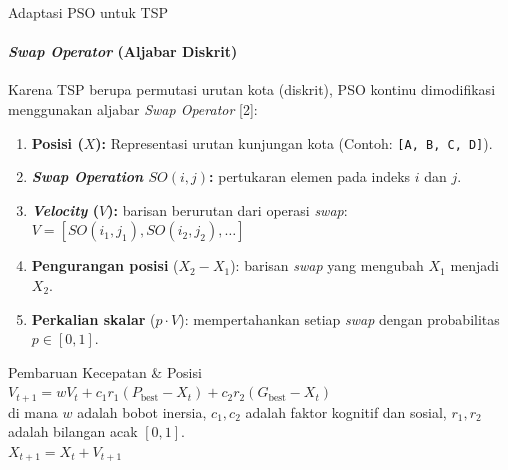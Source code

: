 \documentclass[aspectratio=169,10pt]{beamer}
\begin{document}
\begin{frame}{Adaptasi PSO untuk TSP}
  \framesubtitle{\textit{Swap Operator} (Aljabar Diskrit)}
  Karena TSP berupa permutasi urutan kota (diskrit), PSO kontinu dimodifikasi menggunakan aljabar \textit{Swap Operator} [2]:
  
  \vspace{0.1cm}
  \begin{enumerate}\small
    \item \textbf{Posisi ($X$):} Representasi urutan kunjungan kota (Contoh: \texttt{[A, B, C, D]}).
    \item \textbf{\textit{Swap Operation} $SO(i, j)$:} pertukaran elemen pada indeks $i$ dan $j$.
    \item \textbf{\textit{Velocity} ($V$):} barisan berurutan dari operasi \textit{swap}: $V = [SO(i_1, j_1), SO(i_2, j_2), \dots]$
    \item \textbf{Pengurangan posisi} ($X_2 - X_1$): barisan \textit{swap} yang mengubah $X_1$ menjadi $X_2$.
    \item \textbf{Perkalian skalar} ($p \cdot V$): mempertahankan setiap \textit{swap} dengan probabilitas $p \in [0, 1]$.
  \end{enumerate}

  \begin{block}{Pembaruan Kecepatan \& Posisi}
    \centering
    $V_{t+1} = wV_t + c_1 r_1 (P_{\text{best}} - X_t) + c_2 r_2 (G_{\text{best}} - X_t)$ \\
    {\scriptsize di mana $w$ adalah bobot inersia, $c_1, c_2$ adalah faktor kognitif dan sosial, $r_1, r_2$ adalah bilangan acak $[0, 1]$.} \\[0.1cm]
    $X_{t+1} = X_t + V_{t+1}$
  \end{block}
\end{frame}
\end{document}
